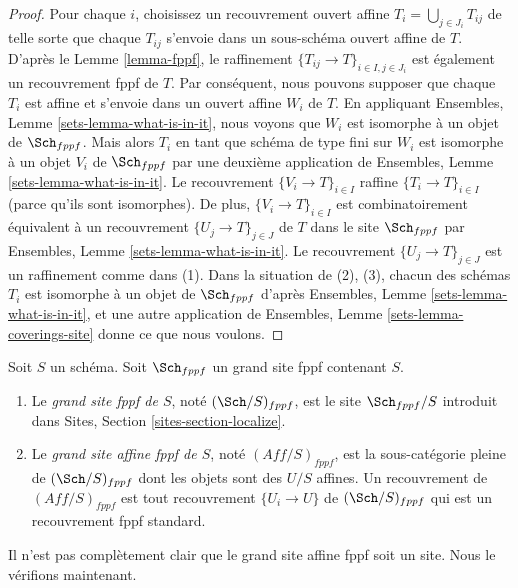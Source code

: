 \begin{proof}
Pour chaque $i$, choisissez un recouvrement ouvert affine $T_i = \bigcup_{j \in J_i} T_{ij}$ de telle sorte que chaque $T_{ij}$ s'envoie dans un sous-schéma ouvert affine de $T$. D'après le Lemme \ref{lemma-fppf}, le raffinement $\{T_{ij} \to T\}_{i \in I, j \in J_i}$ est également un recouvrement fppf de $T$. Par conséquent, nous pouvons supposer que chaque $T_i$ est affine et s'envoie dans un ouvert affine $W_i$ de $T$. En appliquant Ensembles, Lemme \ref{sets-lemma-what-is-in-it}, nous voyons que $W_i$ est isomorphe à un objet de $\Sch_{fppf}$. Mais alors $T_i$ en tant que schéma de type fini sur $W_i$ est isomorphe à un objet $V_i$ de $\Sch_{fppf}$ par une deuxième application de Ensembles, Lemme \ref{sets-lemma-what-is-in-it}. Le recouvrement $\{V_i \to T\}_{i \in I}$ raffine $\{T_i \to T\}_{i \in I}$ (parce qu'ils sont isomorphes). De plus, $\{V_i \to T\}_{i \in I}$ est combinatoirement équivalent à un recouvrement $\{U_j \to T\}_{j \in J}$ de $T$ dans le site $\Sch_{fppf}$ par Ensembles, Lemme \ref{sets-lemma-what-is-in-it}. Le recouvrement $\{U_j \to T\}_{j \in J}$ est un raffinement comme dans (1). Dans la situation de (2), (3), chacun des schémas $T_i$ est isomorphe à un objet de $\Sch_{fppf}$ d'après Ensembles, Lemme \ref{sets-lemma-what-is-in-it}, et une autre application de Ensembles, Lemme \ref{sets-lemma-coverings-site} donne ce que nous voulons.
\end{proof}


\begin{definition}
\label{definition-big-small-fppf}
Soit $S$ un schéma. Soit $\Sch_{fppf}$ un grand site fppf contenant $S$.
\begin{enumerate}
\item Le {\it grand site fppf de $S$}, noté $(\Sch/S)_{fppf}$, est le site $\Sch_{fppf}/S$ introduit dans Sites, Section \ref{sites-section-localize}.
\item Le {\it grand site affine fppf de $S$}, noté $(\textit{Aff}/S)_{fppf}$, est la sous-catégorie pleine de $(\Sch/S)_{fppf}$ dont les objets sont des $U/S$ affines. Un recouvrement de $(\textit{Aff}/S)_{fppf}$ est tout recouvrement $\{U_i \to U\}$ de $(\Sch/S)_{fppf}$ qui est un recouvrement fppf standard.
\end{enumerate}
\end{definition}

\noindent
Il n'est pas complètement clair que le grand site affine fppf soit un site. Nous le vérifions maintenant.

